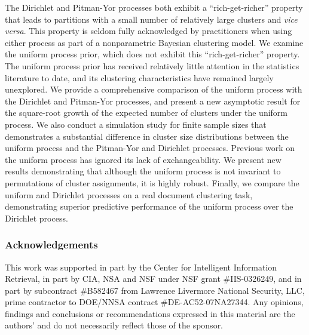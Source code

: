 \documentclass[twoside]{article}
\begin{document}
The Dirichlet and Pitman-Yor processes both exhibit a
``rich-get-richer'' property that leads to partitions with a small
number of relatively large clusters and \emph{vice versa}. This
property is seldom fully acknowledged by practitioners when using
either process as part of a nonparametric Bayesian clustering
model. We examine the uniform process prior, which does not exhibit
this ``rich-get-richer'' property. The uniform process prior has
received relatively little attention in the statistics literature to
date, and its clustering characteristics have remained largely
unexplored. We provide a comprehensive comparison of the uniform
process with the Dirichlet and Pitman-Yor processes, and present a new
asymptotic result for the square-root growth of the expected number of
clusters under the uniform process. We also conduct a simulation study
for finite sample sizes that demonstrates a substantial difference in
cluster size distributions between the uniform process and the
Pitman-Yor and Dirichlet processes. Previous work on the uniform
process has ignored its lack of exchangeability. We present new
results demonstrating that although the uniform process is not
invariant to permutations of cluster assignments, it is highly
robust. Finally, we compare the uniform and Dirichlet processes on a
real document clustering task, demonstrating superior predictive
performance of the uniform process over the Dirichlet process.

\subsubsection*{Acknowledgements}

{

\small

This work was supported in part by the Center for Intelligent
Information Retrieval, in part by CIA, NSA and NSF under NSF grant
\#IIS-0326249, and in part by subcontract \#B582467 from Lawrence
Livermore National Security, LLC, prime contractor to DOE/NNSA
contract \#DE-AC52-07NA27344. Any opinions, findings and conclusions
or recommendations expressed in this material are the authors' and do
not necessarily reflect those of the sponsor.

}
\end{document}
